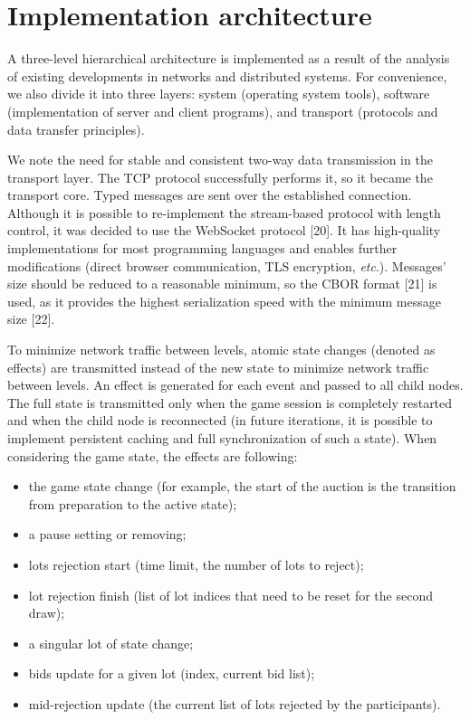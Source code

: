 \documentclass[
]{ceurart}
\begin{document}
\section{Implementation architecture}
\label{sec:impl-arch}

A three-level hierarchical architecture is implemented as a result of the analysis of existing developments in networks and distributed systems. For convenience, we also divide it into three layers: system (operating system tools), software (implementation of server and client programs), and transport (protocols and data transfer principles).

We note the need for stable and consistent two-way data transmission in the transport layer. The TCP protocol successfully performs it, so it became the transport core. Typed messages are sent over the established connection. Although it is possible to re-implement the stream-based protocol with length control, it was decided to use the WebSocket protocol [20]. It has high-quality implementations for most programming languages and enables further modifications (direct browser communication, TLS encryption, \emph{etc}.). Messages' size should be reduced to a reasonable minimum, so the CBOR format [21] is used, as it provides the highest serialization speed with the minimum message size [22].

To minimize network traffic between levels, atomic state changes (denoted as effects) are transmitted instead of the new state to minimize network traffic between levels. An effect is generated for each event and passed to all child nodes. The full state is transmitted only when the game session is completely restarted and when the child node is reconnected (in future iterations, it is possible to implement persistent caching and full synchronization of such a state).
When considering the game state, the effects are following:
\begin{itemize}
\item the game state change (for example, the start of the auction is the transition from preparation to the active state);
  \item  a pause setting or removing;
  \item  lots rejection start (time limit, the number of lots to reject);
  \item  lot rejection finish (list of lot indices that need to be reset for the second draw);
  \item  a singular lot of state change;
  \item  bids update for a given lot (index, current bid list);
  \item  mid-rejection update (the current list of lots rejected by the participants).
\end{itemize}
\end{document}
